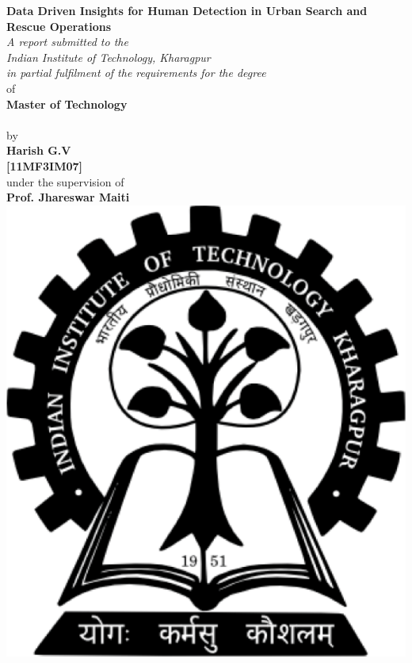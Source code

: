 \documentclass[12pt]{report}
\begin{document}








\thispagestyle{empty}
\begin{center}

\textbf{\LARGE Data Driven Insights for Human Detection in Urban Search and Rescue Operations}\\[2em]

\textit {A report submitted to the}\\[-0.5em]
\textit{Indian Institute of Technology, Kharagpur}\\[-0.5em]
\textit{in partial fulfilment of the requirements for the degree}\\[0.6em]
of\\[0.6em]

\textbf{\large Master of Technology}\\[-0.5em]
\textbf{}\\[0.5em]

by\\[0.3em]
\textbf{\large Harish G.V}\\[-0.3em]
\textbf{\large [11MF3IM07]}\\[1em]

under the supervision of\\[0em]
\textbf{\large Prof. Jhareswar Maiti}\\[2em]

\vspace{2em}
\includegraphics[scale=0.3]{kgp-logo.pdf}
\vspace{2em}


\end{center}
\end{document}
